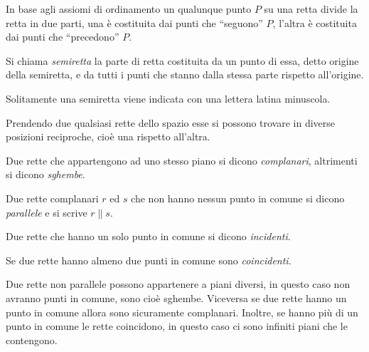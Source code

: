 In base agli assiomi di ordinamento un qualunque punto \(P\) su una 
retta divide la retta in due parti, una è costituita dai punti che 
``seguono'' \(P\), l'altra è costituita dai punti che ``precedono'' \(P\).
\begin{definizione}
Si chiama \emph{semiretta} la parte di retta costituita da un punto 
di essa, detto origine della semiretta, e da tutti i punti che stanno 
dalla stessa parte rispetto all'origine.
\end{definizione}
Solitamente una semiretta viene indicata con una lettera latina 
minuscola.

Prendendo due qualsiasi rette dello spazio esse si possono trovare in 
diverse posizioni reciproche, cioè una rispetto all'altra.
\begin{definizione}
Due rette che appartengono ad uno stesso piano si dicono 
\emph{complanari}, altrimenti si dicono \emph{sghembe}.
\end{definizione}

\begin{definizione}
Due rette complanari \(r\) ed \(s\) che non hanno nessun punto in comune 
si dicono \emph{parallele} e si scrive \(r\parallel s\).
\end{definizione}

\begin{definizione}
Due rette che hanno un solo punto in comune si dicono 
\emph{incidenti}.
\end{definizione}

\begin{definizione}
Se due rette hanno almeno due punti in comune sono \emph{coincidenti}.
\end{definizione}

\begin{inaccessibleblock}
 \begin{center} \end{center}
\end{inaccessibleblock}

\osservazione Due rette non parallele possono appartenere a piani 
diversi, in questo caso non avranno punti in comune, sono cioè 
sghembe. Viceversa se due rette hanno un punto in comune allora sono 
sicuramente complanari. Inoltre, se hanno più di un punto in comune 
le rette coincidono, in questo caso ci sono infiniti piani che le 
contengono. 

